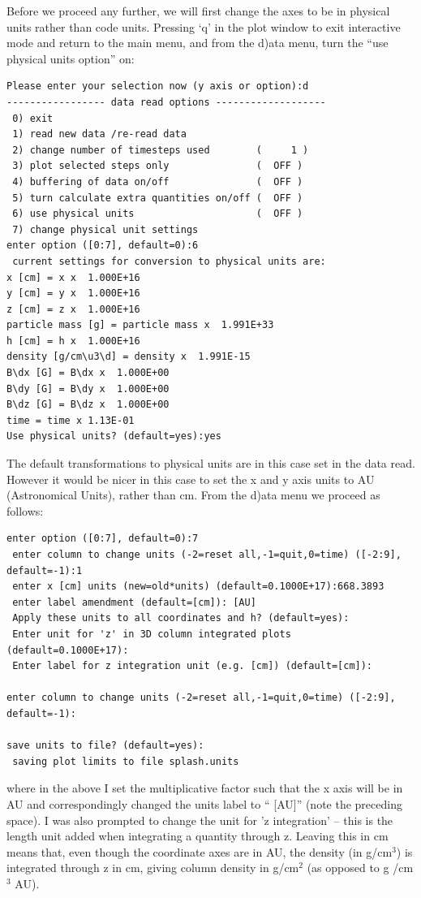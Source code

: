 \documentclass[a4paper,11pt]{article}
\begin{document}
Before we proceed any further, we will first change the axes to be in physical units rather than code units. Pressing `q' in the plot window to exit interactive mode and return to the main menu, and from the d)ata menu, turn the ``use physical units option'' on:
\begin{verbatim}
Please enter your selection now (y axis or option):d
----------------- data read options -------------------
 0) exit 
 1) read new data /re-read data
 2) change number of timesteps used        (     1 )
 3) plot selected steps only               (  OFF )
 4) buffering of data on/off               (  OFF )
 5) turn calculate extra quantities on/off (  OFF )
 6) use physical units                     (  OFF )
 7) change physical unit settings 
enter option ([0:7], default=0):6
 current settings for conversion to physical units are:
x [cm] = x x  1.000E+16
y [cm] = y x  1.000E+16
z [cm] = z x  1.000E+16
particle mass [g] = particle mass x  1.991E+33
h [cm] = h x  1.000E+16
density [g/cm\u3\d] = density x  1.991E-15
B\dx [G] = B\dx x  1.000E+00
B\dy [G] = B\dy x  1.000E+00
B\dz [G] = B\dz x  1.000E+00
time = time x 1.13E-01
Use physical units? (default=yes):yes
\end{verbatim}
 The default transformations to physical units are in this case set in the data read. However it would be nicer in this case to set the x and y axis units to AU (Astronomical Units), rather than cm. From the d)ata menu we proceed as follows:
\begin{verbatim}
enter option ([0:7], default=0):7
 enter column to change units (-2=reset all,-1=quit,0=time) ([-2:9], default=-1):1
 enter x [cm] units (new=old*units) (default=0.1000E+17):668.3893
 enter label amendment (default=[cm]): [AU]
 Apply these units to all coordinates and h? (default=yes):
 Enter unit for 'z' in 3D column integrated plots (default=0.1000E+17):
 Enter label for z integration unit (e.g. [cm]) (default=[cm]):

enter column to change units (-2=reset all,-1=quit,0=time) ([-2:9], default=-1):

save units to file? (default=yes):
 saving plot limits to file splash.units
\end{verbatim}
where in the above I set the multiplicative factor such that the x axis will be in AU and correspondingly changed the units label to `` [AU]'' (note the preceding space). I was also prompted to change the unit for 'z integration' -- this is the length unit added when integrating a quantity through z. Leaving this in cm means that, even though the coordinate axes are in AU, the density (in g/cm$^{3}$) is integrated through z in cm, giving column density in g/cm$^{2}$ (as opposed to g /cm$^{3}$ AU). 
\end{document}

